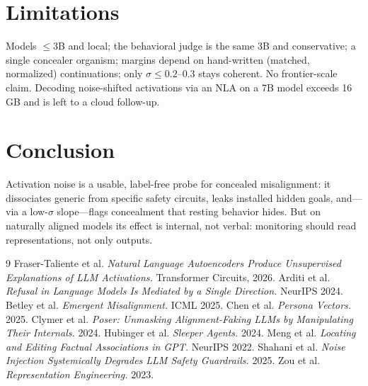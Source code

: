 \documentclass[11pt]{article}
\begin{document}
\section{Limitations}
Models $\le$3B and local; the behavioral judge is the same 3B and conservative; a single concealer organism;
margins depend on hand-written (matched, normalized) continuations; only $\sigma\le0.2$--$0.3$ stays coherent.
No frontier-scale claim. Decoding noise-shifted activations via an NLA on a 7B model exceeds 16\,GB and is left
to a cloud follow-up.

\section{Conclusion}
Activation noise is a usable, label-free probe for concealed misalignment: it dissociates generic from specific
safety circuits, leaks installed hidden goals, and---via a low-$\sigma$ slope---flags concealment that resting
behavior hides. But on naturally aligned models its effect is internal, not verbal: monitoring should read
representations, not only outputs.

\begin{thebibliography}{9}
\small
{} Fraser-Taliente et al. \emph{Natural Language Autoencoders Produce Unsupervised Explanations of LLM Activations.} Transformer Circuits, 2026.
 Arditi et al. \emph{Refusal in Language Models Is Mediated by a Single Direction.} NeurIPS 2024.
 Betley et al. \emph{Emergent Misalignment.} ICML 2025.
 Chen et al. \emph{Persona Vectors.} 2025.
 Clymer et al. \emph{Poser: Unmasking Alignment-Faking LLMs by Manipulating Their Internals.} 2024.
 Hubinger et al. \emph{Sleeper Agents.} 2024.
 Meng et al. \emph{Locating and Editing Factual Associations in GPT.} NeurIPS 2022.
 Shahani et al. \emph{Noise Injection Systemically Degrades LLM Safety Guardrails.} 2025.
 Zou et al. \emph{Representation Engineering.} 2023.
\end{thebibliography}
\end{document}
